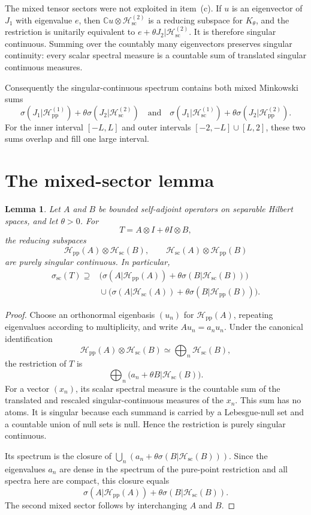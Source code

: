\documentclass[11pt,a4paper]{article}
\newtheorem{lemma}[theorem]{Lemma}
\newcommand{\Hpp}{\mathcal H_{\mathrm{pp}}}
\newcommand{\Hsc}{\mathcal H_{\mathrm{sc}}}
\begin{document}
The mixed tensor sectors were not exploited in item~(c).  If $u$ is an
eigenvector of $J_1$ with eigenvalue $e$, then
$\mathbb C u\otimes\Hsc^{(2)}$ is a reducing subspace for $K_\theta$, and
the restriction is unitarily equivalent to $e+\theta J_2|\Hsc^{(2)}$.
It is therefore singular continuous.  Summing over the countably many
eigenvectors preserves singular continuity: every scalar spectral measure is
a countable sum of translated singular continuous measures.

Consequently the singular-continuous spectrum contains both mixed Minkowski
sums
\[
 \sigma(J_1|\Hpp^{(1)})+\theta\sigma(J_2|\Hsc^{(2)})
 \quad\text{and}\quad
 \sigma(J_1|\Hsc^{(1)})+\theta\sigma(J_2|\Hpp^{(2)}).
\]
For the inner interval $[-L,L]$ and outer intervals
$[-2,-L]\cup[L,2]$, these two sums overlap and fill one large interval.

\section{The mixed-sector lemma}

\begin{lemma}\label{lem:mixed}
Let $A$ and $B$ be bounded self-adjoint operators on separable Hilbert
spaces, and let $\theta>0$.  For
\[
 T=A\otimes I+\theta I\otimes B,
\]
the reducing subspaces
\[
 \Hpp(A)\otimes\Hsc(B),\qquad
 \Hsc(A)\otimes\Hpp(B)
\]
are purely singular continuous.  In particular,
\begin{align*}
 \sigma_{\mathrm{sc}}(T)\supseteq{}&
 \bigl(\sigma(A|\Hpp(A))+\theta\sigma(B|\Hsc(B))\bigr)\\
 &{}\cup
 \bigl(\sigma(A|\Hsc(A))+\theta\sigma(B|\Hpp(B))\bigr).
\end{align*}
\end{lemma}

\begin{proof}
Choose an orthonormal eigenbasis $(u_n)$ for $\Hpp(A)$, repeating
eigenvalues according to multiplicity, and write $Au_n=a_nu_n$.  Under the
canonical identification
\[
 \Hpp(A)\otimes\Hsc(B)
 \simeq \bigoplus_n\Hsc(B),
\]
the restriction of $T$ is
\[
 \bigoplus_n\bigl(a_n+\theta B|\Hsc(B)\bigr).
\]
For a vector $(x_n)$, its scalar spectral measure is the countable sum of
the translated and rescaled singular-continuous measures of the $x_n$.
This sum has no atoms.  It is singular because each summand is carried by a
Lebesgue-null set and a countable union of null sets is null.  Hence the
restriction is purely singular continuous.

Its spectrum is the closure of
$\bigcup_n(a_n+\theta\sigma(B|\Hsc(B)))$.  Since the eigenvalues $a_n$ are
dense in the spectrum of the pure-point restriction and all spectra here are
compact, this closure equals
\[
 \sigma(A|\Hpp(A))+\theta\sigma(B|\Hsc(B)).
\]
The second mixed sector follows by interchanging $A$ and $B$.
\end{proof}
\end{document}
